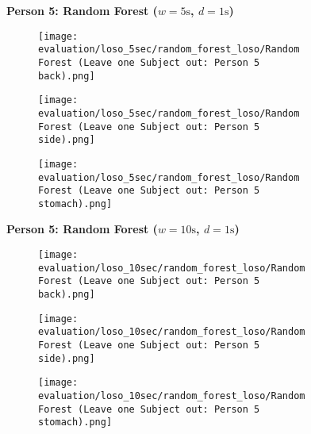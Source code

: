 \begin{figure}
    \textbf{Person 5: Random Forest ($w=5\si{\s}$, $d=1\si{\s}$)}
      \centering
      \begin{subfigure}{1\textwidth}
          \texttt{[image: evaluation/loso\_5sec/random\_forest\_loso/Random Forest (Leave one Subject out: Person 5 back).png]}
        \end{subfigure}
        \begin{subfigure}{1\textwidth}
          \texttt{[image: evaluation/loso\_5sec/random\_forest\_loso/Random Forest (Leave one Subject out: Person 5 side).png]}
        \end{subfigure}
        \begin{subfigure}{1\textwidth}
          \texttt{[image: evaluation/loso\_5sec/random\_forest\_loso/Random Forest (Leave one Subject out: Person 5 stomach).png]}
      \end{subfigure}
        \textbf{Person 5: Random Forest ($w=10\si{\s}$, $d=1\si{\s}$)}
      \centering
      \begin{subfigure}{1\textwidth}
          \texttt{[image: evaluation/loso\_10sec/random\_forest\_loso/Random Forest (Leave one Subject out: Person 5 back).png]}
        \end{subfigure}
        \begin{subfigure}{1\textwidth}
          \texttt{[image: evaluation/loso\_10sec/random\_forest\_loso/Random Forest (Leave one Subject out: Person 5 side).png]}
        \end{subfigure}
        \begin{subfigure}{1\textwidth}
          \texttt{[image: evaluation/loso\_10sec/random\_forest\_loso/Random Forest (Leave one Subject out: Person 5 stomach).png]}
      \end{subfigure}
  
      \label{evaluation:random_forest_loso:person5}
\end{figure}
